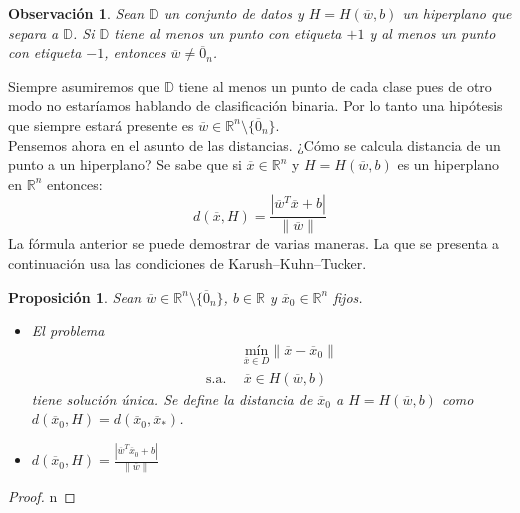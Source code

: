 \documentclass[11pt]{article}
\newtheorem{observation}{Observación}[section]
\newtheorem{proposition}{Proposición}[section]
\newcommand{\R}{\mathbb{R}}
\newcommand{\Rn}{\R^{n}}
\newcommand{\wv}{\overline{w}}
\newcommand{\x}{\overline{x}}
\newcommand{\xz}{\overline{x}_{0}}
\newcommand{\z}{\overline{0}_{n}}
\newcommand{\Rnz}{\Rn\setminus\{\z\}}
\newcommand{\xo}{\overline{x}_{*}}
\newcommand{\Dat}{\mathbb{D}}
\newcommand{\nw}{\|\wv\|}
\begin{document}
\begin{observation}
Sean $\Dat$ un conjunto de datos y $H=H(\wv, b)$ un hiperplano que separa a $\Dat$. Si $\Dat$ tiene al menos un punto con etiqueta $+1$ y al menos un punto con etiqueta $-1$, entonces $\wv\ne\z$.
\end{observation}

Siempre asumiremos que $\Dat$ tiene al menos un punto de cada clase pues de otro modo no estaríamos hablando de clasificación binaria. Por lo tanto una hipótesis que siempre estará presente es $\wv\in\Rnz$.\\

Pensemos ahora en el asunto de las distancias. ¿Cómo se calcula distancia de un punto a un hiperplano? Se sabe que si $\x\in\Rn$ y $H=H(\wv, b)$ es un hiperplano en $\Rn$ entonces:
$$d(\x, H)=\frac{|\wv^{T}\x+b|}{\|\wv\|}$$
La fórmula anterior se puede demostrar de varias maneras. La que se presenta a continuación usa las condiciones de Karush--Kuhn--Tucker.
\begin{proposition}
Sean $\wv\in\Rnz$, $b\in\R$ y $\xz\in\Rn$ fijos.
\begin{itemize}
\item[(i)] El problema
\begin{equation*}
\begin{aligned}
& \underset{\x\in D}{\text{mín}} \|\x-\xz\| \\
\text{s.a.}\ \
& \x\in H(\wv, b)
\end{aligned}
\end{equation*}
tiene solución única. Se define la distancia de $\xz$ a $H=H(\wv, b)$ como $d(\xz, H)= d(\xz,\xo)$.
\item[(ii)] $d(\xz, H)=\frac{|\wv^{T}\xz+b|}{\nw}$
\end{itemize}
\end{proposition}
\begin{proof}
n
\end{proof}
\end{document}
